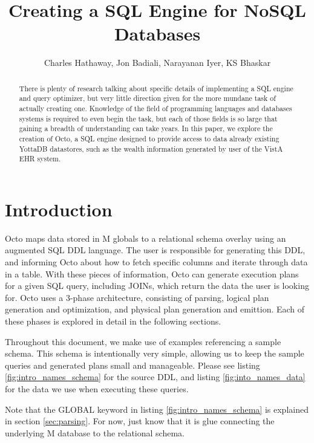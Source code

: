 \documentclass[]{article}
\title{Creating a SQL Engine for NoSQL Databases}
\author{Charles Hathaway, Jon Badiali, Narayanan Iyer, KS Bhaskar}
\begin{document}
\maketitle

\tableofcontents

\begin{abstract}
	
	There is plenty of research talking about specific details of implementing a SQL engine and query optimizer, but very little direction given for the more mundane task of actually creating one.
	Knowledge of the field of programming languages and databases systems is required to even begin the task, but each of those fields is so large that gaining a breadth of understanding can take years.
	In this paper, we explore the creation of Octo, a SQL engine designed to provide access to data already existing YottaDB datastores, such as the wealth information generated by user of the VistA EHR system.

\end{abstract}


\section{Introduction}

Octo maps data stored in M globals to a relational schema overlay using an augmented SQL DDL language.
The user is responsible for generating this DDL, and informing Octo about how to fetch specific columns and iterate through data in a table.
With these pieces of information, Octo can generate execution plans for a given SQL query, including JOINs, which return the data the user is looking for.
Octo uses a 3-phase architecture, consisting of parsing, logical plan generation and optimization, and physical plan generation and emittion.
Each of these phases is explored in detail in the following sections.

Throughout this document, we make use of examples referencing a sample schema.
This schema is intentionally very simple, allowing us to keep the sample queries and generated plans small and manageable.
Please see listing \ref{fig:intro_names_schema} for the source DDL, and listing \ref{fig:into_names_data} for the data we use when executing these queries.

Note that the GLOBAL keyword in listing \ref{fig:intro_names_schema} is explained in section \ref{sec:parsing}.
For now, just know that it is glue connecting the underlying M database to the relational schema.
\end{document}
